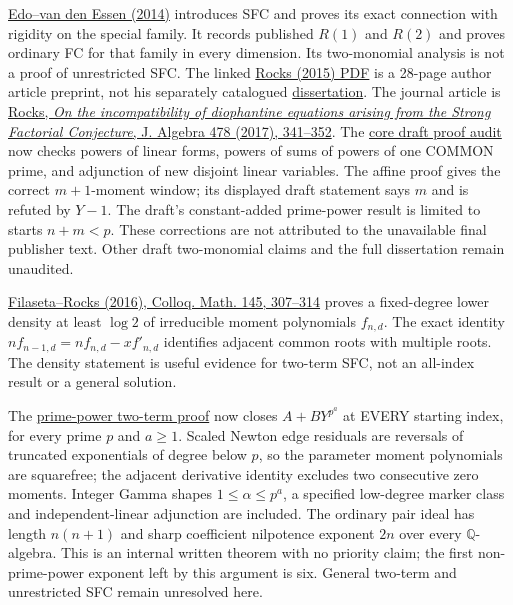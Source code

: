 \documentclass[11pt]{article}
\newcommand{\Q}{\mathbb Q}
\begin{document}
\href{https://arxiv.org/abs/1304.3956}{Edo--van den Essen (2014)} introduces
SFC and proves its exact connection with rigidity on the special family.
It records published $R(1)$ and $R(2)$ and proves ordinary FC for that
family in every dimension. Its two-monomial analysis is not a proof of
unrestricted SFC. The linked
\href{https://people.math.sc.edu/rocks/BradyRocksSFC2015.pdf}{Rocks (2015) PDF}
is a 28-page author article preprint, not his separately catalogued
\href{https://doi.org/10.7936/K7BR8QB4}{dissertation}.
The journal article is \href{https://doi.org/10.1016/j.jalgebra.2017.01.039}{Rocks,
\emph{On the incompatibility of diophantine equations arising from the Strong
Factorial Conjecture}, J. Algebra 478 (2017), 341--352}.
The \href{SFC_WINDOWS_AND_ROCKS_AUDIT.tex}{core draft proof audit} now checks
powers of linear forms, powers of sums of powers of one COMMON prime,
and adjunction of new disjoint linear variables. The affine proof gives
the correct $m+1$-moment window; its displayed draft statement says $m$
and is refuted by $Y-1$. The draft's constant-added prime-power result is
limited to starts $n+m<p$. These corrections are not attributed to the
unavailable final publisher text. Other draft two-monomial claims and
the full dissertation remain unaudited.

\href{https://doi.org/10.4064/cm6761-3-2016}{Filaseta--Rocks (2016),
Colloq. Math. 145, 307--314} proves a fixed-degree lower density at least
$\log2$ of irreducible moment polynomials $f_{n,d}$. The exact identity
$n f_{n-1,d}=n f_{n,d}-x f'_{n,d}$ identifies adjacent common roots with
multiple roots. The density statement is useful evidence for two-term
SFC, not an all-index result or a general solution.

The \href{PRIME_POWER_TWO_TERM_SFC.tex}{prime-power two-term proof} now
closes $A+BY^{p^a}$ at EVERY starting index, for every prime $p$ and
$a\ge1$. Scaled Newton edge residuals are reversals of truncated
exponentials of degree below $p$, so the parameter moment polynomials
are squarefree; the adjacent derivative identity excludes two consecutive
zero moments. Integer Gamma shapes $1\le\alpha\le p^a$, a specified
low-degree marker class and independent-linear adjunction are included.
The ordinary pair ideal has length $n(n+1)$ and sharp coefficient
nilpotence exponent $2n$ over every $\Q$-algebra. This is an internal
written theorem with no priority claim; the first non-prime-power exponent
left by this argument is six. General two-term and unrestricted SFC
remain unresolved here.
\end{document}
